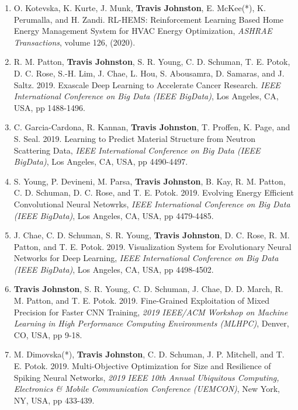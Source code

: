 \documentclass{article}
\begin{document}
	\begin{enumerate}[1.]
        \item O. Kotevska, K. Kurte, J. Munk, \textbf{Travis Johnston}, E. McKee(*), K. Perumalla, and H. Zandi.
        RL-HEMS: Reinforcement Learning Based Home Energy Management System for HVAC Energy Optimization,
        \textit{ASHRAE Transactions}, volume 126, (2020).

        \item R. M. Patton, \textbf{Travis Johnston}, S. R. Young, C. D. Schuman, T. E. Potok,
        D. C. Rose, S.-H. Lim, J. Chae, L. Hou, S. Abousamra, D. Samaras, and J. Saltz.  2019.
        Exascale Deep Learning to Accelerate Cancer Research.
        \textit{IEEE International Conference on Big Data (IEEE BigData)},
        Los Angeles, CA, USA, pp 1488-1496.


        \item C. Garcia-Cardona, R. Kannan, \textbf{Travis Johnston}, T. Proffen, K. Page, and S. Seal. 2019.
        Learning to Predict Material Structure from Neutron Scattering Data,
        \textit{IEEE International Conference on Big Data (IEEE BigData)}, Los Angeles, CA, USA, pp 4490-4497.

        \item S. Young, P. Devineni, M. Parsa, \textbf{Travis Johnston}, B. Kay, R. M. Patton, C. D. Schuman, D. C. Rose, and T. E. Potok. 2019.
        Evolving Energy Efficient Convolutional Neural Netowrks,
        \textit{IEEE International Conference on Big Data (IEEE BigData)},
        Los Angeles, CA, USA, pp 4479-4485.

        \item J. Chae, C. D. Schuman, S. R. Young, \textbf{Travis Johnston}, D. C. Rose, R. M. Patton, and T. E. Potok. 2019.
        Visualization System for Evolutionary Neural Networks for Deep Learning,
        \textit{IEEE International Conference on Big Data (IEEE BigData)},
        Los Angeles, CA, USA, pp 4498-4502.

        \item \textbf{Travis Johnston}, S. R. Young, C. D. Schuman, J. Chae, D. D. March, R. M. Patton, and T. E. Potok.  2019.
        Fine-Grained Exploitation of Mixed Precision for Faster CNN Training,
        \textit{2019 IEEE/ACM Workshop on Machine Learning in High Performance Computing Environments (MLHPC)},
        Denver, CO, USA, pp 9-18.

        \item M. Dimovska(*), \textbf{Travis Johnston}, C. D. Schuman, J. P. Mitchell, and T. E. Potok.  2019.
        Multi-Objective Optimization for Size and Resilience of Spiking Neural Networks,
        \textit{2019 IEEE 10th Annual Ubiquitous Computing, Electronics \& Mobile Communication Conference (UEMCON)},
        New York, NY, USA, pp 433-439.



\end{enumerate}
\end{document}
